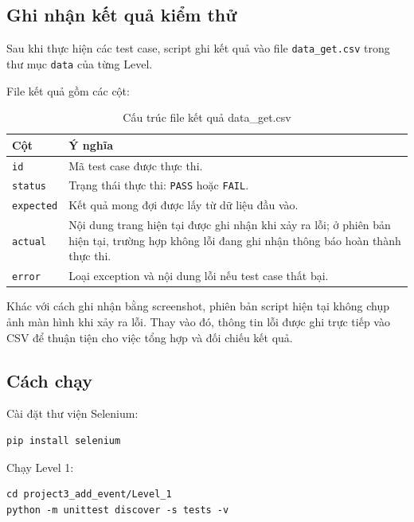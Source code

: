 \documentclass[12pt,a4paper]{article}
\begin{document}
\subsection{Ghi nhận kết quả kiểm thử}

Sau khi thực hiện các test case, script ghi kết quả vào file \texttt{data\_get.csv} trong thư mục \texttt{data} của từng Level.

File kết quả gồm các cột:

\begin{table}[H]
\centering\small
\begin{tabular}{|L{3.2cm}|L{10.8cm}|}
\hline
{}
\textbf{Cột} & \textbf{Ý nghĩa} \\ \hline

\texttt{id}
& Mã test case được thực thi. \\ \hline

\texttt{status}
& Trạng thái thực thi: \texttt{PASS} hoặc \texttt{FAIL}. \\ \hline

\texttt{expected}
& Kết quả mong đợi được lấy từ dữ liệu đầu vào. \\ \hline

\texttt{actual}
& Nội dung trang hiện tại được ghi nhận khi xảy ra lỗi; ở phiên bản hiện tại, trường hợp không lỗi đang ghi nhận thông báo hoàn thành thực thi. \\ \hline

\texttt{error}
& Loại exception và nội dung lỗi nếu test case thất bại. \\ \hline
\end{tabular}
\caption{Cấu trúc file kết quả data\_get.csv}
\end{table}

Khác với cách ghi nhận bằng screenshot, phiên bản script hiện tại không chụp ảnh màn hình khi xảy ra lỗi. Thay vào đó, thông tin lỗi được ghi trực tiếp vào CSV để thuận tiện cho việc tổng hợp và đối chiếu kết quả.

\subsection{Cách chạy}

Cài đặt thư viện Selenium:

\begin{lstlisting}
pip install selenium
\end{lstlisting}

Chạy Level 1:

\begin{lstlisting}
cd project3_add_event/Level_1
python -m unittest discover -s tests -v
\end{lstlisting}
\end{document}
